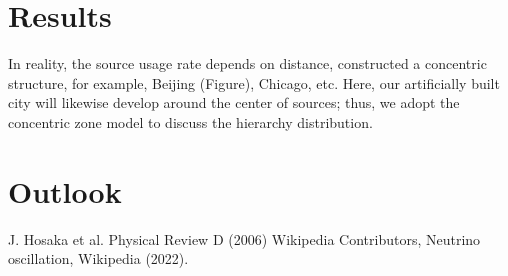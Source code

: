 \documentclass[12pt]{article}
\begin{document}
\begin{multicols}{2}
\section{Results}
    In reality, the source usage rate depends on distance, constructed a concentric structure, for example, Beijing (Figure), Chicago, etc. Here, our artificially built city will likewise develop around the center of sources; thus, we adopt the concentric zone model to discuss the hierarchy distribution.
    

\section{Outlook}


\begin{thebibliography}{1}

	
     J. Hosaka et al. Physical Review D (2006)
     Wikipedia Contributors, Neutrino oscillation, Wikipedia (2022).
        
    
\end{thebibliography}

    
\end{multicols}
\end{document}
